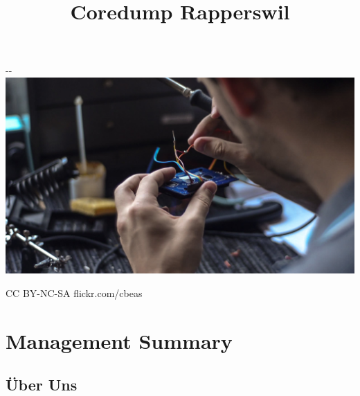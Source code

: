 \documentclass[10pt,a4paper,parskip,fleqn]{scrartcl}
\title{\Huge Coredump Rapperswil}
\begin{document}
\begin{titlepage}

	\maketitle

	\vspace{2cm}

	\begin{adjustwidth}{-\oddsidemargin-1in}{-\rightmargin-1in}
		\includegraphics[width=\paperwidth]{img/soldering.jpg}

		\vspace{-12mm}

		\hfill {\scriptsize \color{light-gray} CC BY-NC-SA flickr.com/cbeas}
	\end{adjustwidth}

	\vfill

\end{titlepage}

\section{Management Summary}

\subsection{Über Uns}
\end{document}

